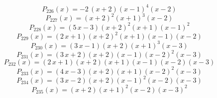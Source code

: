 \subitem \begin{dmath*}P_{226}(x) = -2 \, {\left(x + 2\right)} {\left(x - 1\right)}^{4} {\left(x - 2\right)} \end{dmath*}\vspace{-1.2cm}
\subitem \begin{dmath*}P_{227}(x) = {\left(x + 2\right)}^{2} {\left(x + 1\right)}^{3} {\left(x - 2\right)} \end{dmath*}\vspace{-1.2cm}
\subitem \begin{dmath*}P_{228}(x) = {\left(5 \, x - 3\right)} {\left(x + 2\right)}^{2} {\left(x + 1\right)} {\left(x - 1\right)}^{2} \end{dmath*}\vspace{-1.2cm}
\subitem \begin{dmath*}P_{229}(x) = {\left(2 \, x + 1\right)} {\left(x + 2\right)}^{2} {\left(x + 1\right)} {\left(x - 1\right)} {\left(x - 2\right)} \end{dmath*}\vspace{-1.2cm}
\subitem \begin{dmath*}P_{230}(x) = {\left(3 \, x - 1\right)} {\left(x + 2\right)} {\left(x + 1\right)}^{3} {\left(x - 3\right)} \end{dmath*}\vspace{-1.2cm}
\subitem \begin{dmath*}P_{231}(x) = {\left(3 \, x + 2\right)} {\left(x + 2\right)} {\left(x - 1\right)} {\left(x - 2\right)}^{2} {\left(x - 3\right)} \end{dmath*}\vspace{-1.2cm}
\subitem \begin{dmath*}P_{232}(x) = {\left(2 \, x + 1\right)} {\left(x + 2\right)} {\left(x + 1\right)} {\left(x - 1\right)} {\left(x - 2\right)} {\left(x - 3\right)} \end{dmath*}\vspace{-1.2cm}
\subitem \begin{dmath*}P_{233}(x) = {\left(4 \, x - 3\right)} {\left(x + 2\right)} {\left(x + 1\right)} {\left(x - 2\right)}^{2} {\left(x - 3\right)} \end{dmath*}\vspace{-1.2cm}
\subitem \begin{dmath*}P_{234}(x) = {\left(3 \, x - 2\right)} {\left(x + 2\right)} {\left(x - 1\right)}^{2} {\left(x - 2\right)} {\left(x - 3\right)} \end{dmath*}\vspace{-1.2cm}
\subitem \begin{dmath*}P_{235}(x) = {\left(x + 2\right)} {\left(x + 1\right)}^{2} {\left(x - 2\right)} {\left(x - 3\right)}^{2} \end{dmath*}\vspace{-1.2cm}
